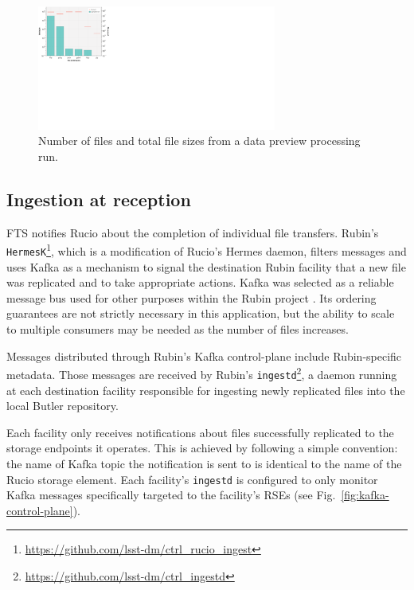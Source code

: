\documentclass{webofc}
\begin{document}
\begin{figure}[h]
\includegraphics[width=0.7\textwidth, center]{images/file_count_and_file_sizes.pdf}
\caption{Number of files and total file sizes from a data preview processing run.}
\label{fig:filecount}
\end{figure}

\subsection{Ingestion at reception}
\label{ingestion}

FTS notifies Rucio about the completion of individual file transfers. Rubin's \texttt{HermesK}\footnote{\url{https://github.com/lsst-dm/ctrl_rucio_ingest}}, which is a modification of Rucio's Hermes daemon, filters messages and uses Kafka as a mechanism to signal the destination Rubin facility that a new file was replicated and to take appropriate actions. Kafka was selected as a reliable message bus used for other purposes within the Rubin project \citep[see e.g.,][]{2024SPIE13101E..1MF,2024SPIE13101E..18R}. Its ordering guarantees are not strictly necessary in this application, but the ability to scale to multiple consumers may be needed as the number of files increases.

Messages distributed through Rubin's Kafka control-plane include Rubin-specific metadata. Those messages are received by Rubin's \texttt{ingestd}\footnote{\url{https://github.com/lsst-dm/ctrl_ingestd}}, a daemon running at each destination facility responsible for ingesting newly replicated files into the local Butler repository.

Each facility only receives notifications about files successfully replicated to the storage endpoints it operates. This is achieved by following a simple convention: the name of Kafka topic the notification is sent to is identical to the name of the Rucio storage element. Each facility's \texttt{ingestd} is configured to only monitor Kafka messages specifically targeted to the facility's RSEs (see Fig.\ \ref{fig:kafka-control-plane}).
\end{document}
